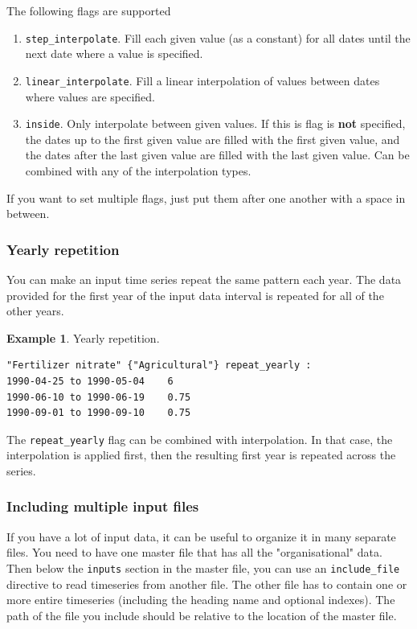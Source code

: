 \documentclass[11pt]{article}
\theoremstyle{definition}
\newtheorem{myexample}{Example}
\newenvironment{example}%
  {\begin{lrbox}{\examplebox}%
   \begin{minipage}{\dimexpr\linewidth-2\fboxsep}
   \begin{myexample}}%
  {\end{myexample}%
   \end{minipage}%
   \end{lrbox}%
   \begin{trivlist}
     \item[]\colorbox{silver}{\usebox\examplebox}
   \end{trivlist}}
\begin{document}
The following flags are supported
\begin{enumerate}
\item {\tt step\_interpolate}. Fill each given value (as a constant) for all dates until the next date where a value is specified.
\item {\tt linear\_interpolate}. Fill a linear interpolation of values between dates where values are specified.
\item {\tt inside}. Only interpolate between given values. If this is flag is  {\bf not} specified, the dates up to the first given value are filled with the first given value, and the dates after the last given value are filled with the last given value. Can be combined with any of the interpolation types.
\end{enumerate}
If you want to set multiple flags, just put them after one another with a space in between.

\subsubsection{Yearly repetition}\label{sec:dat-yearly-repeat}

You can make an input time series repeat the same pattern each year. The data provided for the first year of the input data interval is repeated for all of the other years.

\begin{example}
Yearly repetition.
\begin{lstlisting}
"Fertilizer nitrate" {"Agricultural"} repeat_yearly :
1990-04-25 to 1990-05-04	6
1990-06-10 to 1990-06-19	0.75
1990-09-01 to 1990-09-10	0.75
\end{lstlisting}
\end{example}

The {\tt repeat\_yearly} flag can be combined with interpolation. In that case, the interpolation is applied first, then the resulting first year is repeated across the series.

\subsubsection{Including multiple input files}

If you have a lot of input data, it can be useful to organize it in many separate files. You need to have one master file that has all the "organisational" data. Then below the {\tt inputs} section in the master file, you can use an {\tt include\_file} directive to read timeseries from another file. The other file has to contain one or more entire timeseries (including the heading name and optional indexes). The path of the file you include should be relative to the location of the master file.
\end{document}
